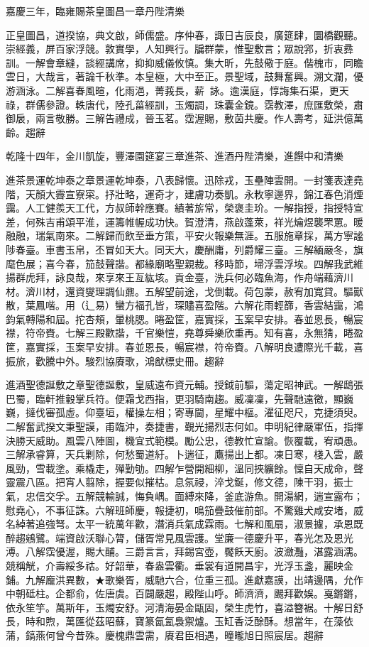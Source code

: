 \begin{pinyinscope}
嘉慶三年，臨雍賜茶皇圖昌一章丹陛清樂

正皇圖昌，道揆協，典文啟，師儒盛。序仲春，諏日吉辰良，廣筵肆，圜橋觀聽。崇經義，屏百家浮競。敦實學，人知興行。牖群蒙，惟聖敷言；眾說郛，折衷彞訓。一解會章縫，談經講席，抑抑威儀攸慎。集大昕，先鼓儆于庭。偕槐市，同瞻雲日，大哉言，著論千秋準。本皇極，大中至正。景聖域，鼓舞奮興。溯文瀾，優游涵泳。二解喜春風暄，化雨浥，菁莪長，薪詠。逾漢庭，惇誨集石渠，更天祿，群儒參證。軼唐代，陸孔菑經訓，玉燭調，珠囊金鏡。霑教澤，庶匯敷榮，肅御扆，兩言敬勝。三解告禮成，晉玉茗。霑渥賜，敷茵共慶。作人壽考，延洪億萬齡。趨辭

乾隆十四年，金川凱旋，豐澤園筵宴三章進茶、進酒丹陛清樂，進饌中和清樂

進茶景運乾坤泰之章景運乾坤泰，八表歸懷。迅除戎，玉壘陣雲開。一封箋表達堯階，天顏大霽宣寮寀。抒壯略，運奇才，建膚功奏凱。永敉寧邊界，錦江春色消煙靄。人工健羨天工代，方叔師幹應賽。績著旂常，榮褒圭玠。一解指授，指授特宣差，何殊吉甫頌平淮，運籌帷幄成功快。賀澄清，燕啟蓬萊，祥光爚煜襲罘罳。暖融融，瑞氣南來。二解歸而飲至垂方策，平安火報樂無涯。五服施章採，萬方寧謐陟春臺。車書玉帛，丕冒如天大。同天大，慶酬庸，列爵耀三臺。三解緬嚴冬，旗麾色展；喜今春，笳鼓聲諧。都緣廟略聖親裁。移時節，埽浮雲浮埃。四解我武維揚群虎拜，詠良哉，來享來王亙紘垓。貢金臺，洗兵何必臨魚海，作舟端藉濟川材。濟川材，還資燮理調仙鼐。五解望前途，戈倒載。荷包蒙，赦宥加寬貸。驅獸散，葉鳳喈。用（辶易）蠻方福孔皆，琛贐喜盈階。六解花雨輕篩，香雲結靄，鴻鈞氣轉陽和屆。拕杏頰，暈桃腮。睠盈筐，嘉實採，玉案早安排。春並恩長，暢宸襟，符帝賚。七解三殿歡諧，千官樂愷，堯尊舜樂欣重再。知有喜，永無猜，睠盈筐，嘉實採，玉案早安排。春並恩長，暢宸襟，符帝賚。八解明良遭際光千載，喜振旅，歡騰中外。駿烈協賡歌，鴻猷標史冊。趨辭

進酒聖德誕敷之章聖德誕敷，皇威遠布資元輔。授鉞前驅，蕩定昭神武。一解鴟張巴蜀，臨軒推轂掌兵符。便霜戈西指，更羽騎南趨。威凜凜，先聲馳遠徼，顯巍巍，撻伐審孤虛。仰臺垣，權操左相；寄專閫，星耀中樞。濯征咫尺，克捷須臾。二解奮武揆文秉聖謨，甫臨沖，奏捷書，覲光揚烈志何如。申明紀律嚴軍伍，指揮決勝天威助。風雲八陣圖，機宜式範模。勵公忠，德教忙宣諭。恢覆載，宥頑愚。三解承睿算，天兵剿除，何愁蜀道紆。卜遄征，鷹揚出上都。凍日寒，棧入雲，嚴風勁，雪載塗。乘橇走，殫勤劬。四解乍營開細柳，溫同挾纊餘。懍自天成命，聲靈震八區。把宵人翦除，握要似摧枯。息氛祲，淬戈鋋，修文德，陳干羽，振士氣，忠信交孚。五解競輸誠，悔負嵎。面縛來降，釜底游魚。開湯網，遄宣露布；慰堯心，不事征誅。六解班師慶，報捷初，鳴笳疊鼓催前部。不驚雞犬咸安堵，威名綽著追強弩。太平一統萬年歡，潛消兵氣成霖雨。七解和風扇，淑景攄，承恩既醉趨鵷鷺。端資啟沃聯心膂，儲胥常見風雲護。堂廉一德慶升平，春光怎及恩光溥。八解霑優渥，賜大酺。三爵言言，拜錫宮壺，饜飫天廚。波瀲灩，湛露涵濡。競稱觥，介壽綏多祜。好韶華，春盎雲衢。垂裳有道開昌宇，光浮玉盞，麗映金鋪。九解龐洪異數，★歌樂胥，威馳六合，位重三孤。進獻嘉謨，出靖邊隅，允作中朝砥柱。企都俞，佐唐虞。百闢嚴趨，殿陛山呼。師濟濟，颺拜歡娛。戛鏘鏘，依永笙竽。萬斯年，玉燭安舒。河清海晏金甌固，榮生虎竹，喜溢簪裾。十解日舒長，時和煦，萬匯從茲昭蘇，寶篆氤氳裊禦爐。玉缸香泛酴酥。想當年，在藻依蒲，鎬燕何曾今昔殊。慶槐鼎雲需，賡君臣相遇，曈曨旭日照宸居。趨辭


\end{pinyinscope}
